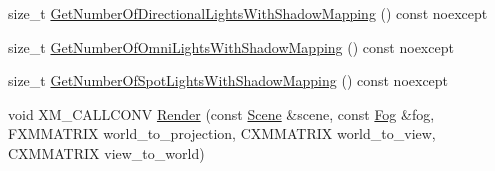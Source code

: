 \begin{DoxyCompactItemize}
size\+\_\+t \hyperlink{structmage_1_1_l_buffer_pass_a14764bc764ed13614595262ddc42ca9e}{Get\+Number\+Of\+Directional\+Lights\+With\+Shadow\+Mapping} () const noexcept
\item 
size\+\_\+t \hyperlink{structmage_1_1_l_buffer_pass_a1efc71062a28fb33474e4ea9a05e9e34}{Get\+Number\+Of\+Omni\+Lights\+With\+Shadow\+Mapping} () const noexcept
\item 
size\+\_\+t \hyperlink{structmage_1_1_l_buffer_pass_a30a1b4e2147eae73633fc33bd10d5f2f}{Get\+Number\+Of\+Spot\+Lights\+With\+Shadow\+Mapping} () const noexcept
\item 
void X\+M\+\_\+\+C\+A\+L\+L\+C\+O\+NV \hyperlink{structmage_1_1_l_buffer_pass_afae386240845baad1f35dc5358dcb096}{Render} (const \hyperlink{classmage_1_1_scene}{Scene} \&scene, const \hyperlink{classmage_1_1_fog}{Fog} \&fog, F\+X\+M\+M\+A\+T\+R\+IX world\+\_\+to\+\_\+projection, C\+X\+M\+M\+A\+T\+R\+IX world\+\_\+to\+\_\+view, C\+X\+M\+M\+A\+T\+R\+IX view\+\_\+to\+\_\+world)
\end{DoxyCompactItemize}
